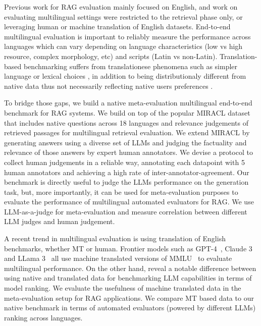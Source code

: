 Previous work for RAG evaluation mainly focused on English, and work on evaluating multilingual settings were restricted to the retrieval phase only, or leveraging human or machine translation of English datasets. End-to-end multilingual evaluation is important to reliably measure the performance across languages which can vary depending on language characteristics (low vs high resource, complex morphology, etc) and scripts (Latin vs non-Latin). Translation-based benchmarking suffers from translationese phenomena such as simpler language or lexical choices \cite{Baker1993CorpusLA, graham-etal-2020-statistical}, in addition to being distributionaly different from native data thus not necessarily reflecting native users preferences \cite{chen-etal-2024-good-data}.

To bridge those gaps, we build a native meta-evaluation multilingual end-to-end benchmark for RAG systems. We build on top of the popular MIRACL \cite{zhang_miracl_2023} dataset that includes native questions across 18 languages and relevance judgements of retrieved passages for multilingual retrieval evaluation. We extend MIRACL by generating answers using a diverse set of LLMs and judging the factuality and relevance of those answers by expert human annotators. We devise a protocol to collect human judgements in a reliable way, annotating each datapoint with 5 human annotators and achieving a high rate of inter-annotator-agreement. Our benchmark is directly useful to judge the LLMs performance on the generation task, but, more importantly, it can be used for meta-evaluation purposes to evaluate the performance of multilingual automated evaluators for RAG. We use LLM-as-a-judge for meta-evaluation and measure correlation between different LLM judges and human judgement. 

A recent trend in multilingual evaluation is using translation of English benchmarks, whether MT or human. Frontier models such as GPT-4~\cite{openai2024gpt4technicalreport}, Claude 3~\cite{claude32024} and LLama 3~\cite{dubey2024llama3herdmodels} all use machine translated versions of MMLU~\cite{hendrycks2021mmlu} %
to evaluate multilingual performance. On the other hand, \cite{chen-etal-2024-good-data} reveal a notable difference between using native and translated data for benchmarking LLM capabilities in terms of model ranking. We evaluate the usefulness of machine translated data in the meta-evaluation setup for RAG applications. We compare MT based data to our native benchmark in terms of automated evaluators (powered by different LLMs) ranking across languages.